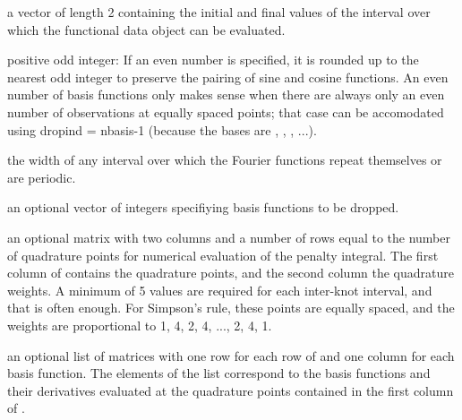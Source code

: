 \documentclass{article}
\begin{document}
\begin{Arguments}
\begin{ldescription}
\item[\code{rangeval}] a vector of length 2 containing the initial and final values of the
interval over which the functional data object can be evaluated.

\item[\code{nbasis}] positive odd integer:  If an even number is specified, it is rounded
up to the nearest odd integer to preserve the pairing of sine and
cosine functions.  An even number of basis functions  only makes
sense when there are always only an even number of observations at
equally spaced points;  that case can be accomodated using dropind =
nbasis-1 (because the bases are , ,
, ...).

\item[\code{period}] the width of any interval over which the Fourier functions repeat
themselves or are periodic.

\item[\code{dropind}] an optional vector of integers specifiying basis functions to be
dropped.

\item[\code{quadvals}] an optional matrix with two columns and a number of rows equal to
the number of quadrature points for numerical evaluation of the
penalty integral.  The first column of  contains the
quadrature points, and the second column the quadrature weights.  A
minimum of 5 values are required for each inter-knot interval, and
that is often enough.  For Simpson's rule, these points are equally
spaced, and the weights are proportional to 1, 4, 2, 4, ..., 2, 4,
1.

\item[\code{values}] an optional list of matrices with one row for each row of
 and one column for each basis function.  The
elements of the list correspond to the basis functions and their
derivatives evaluated at the quadrature points contained in the
first column of .


\end{ldescription}
\end{Arguments}
\end{document}
